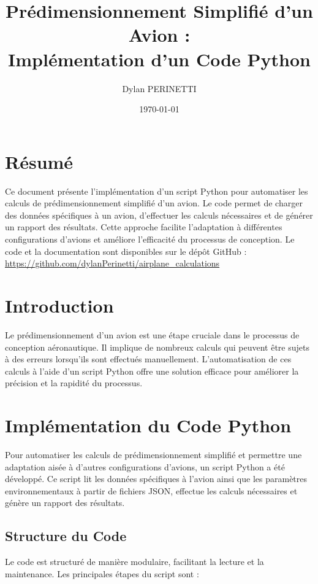 \documentclass[12pt,a4paper]{article}
\title{\textbf{Prédimensionnement Simplifié d'un Avion : \\ Implémentation d'un Code Python}}
\author{Dylan PERINETTI}
\date{\today}
\begin{document}
\maketitle

\tableofcontents
\newpage

\section*{Résumé}

Ce document présente l'implémentation d'un script Python pour automatiser les calculs de prédimensionnement simplifié d'un avion. Le code permet de charger des données spécifiques à un avion, d'effectuer les calculs nécessaires et de générer un rapport des résultats. Cette approche facilite l'adaptation à différentes configurations d'avions et améliore l'efficacité du processus de conception. Le code et la documentation sont disponibles sur le dépôt GitHub : \url{https://github.com/dylanPerinetti/airplane_calculations}

\section{Introduction}

Le prédimensionnement d'un avion est une étape cruciale dans le processus de conception aéronautique. Il implique de nombreux calculs qui peuvent être sujets à des erreurs lorsqu'ils sont effectués manuellement. L'automatisation de ces calculs à l'aide d'un script Python offre une solution efficace pour améliorer la précision et la rapidité du processus.

\section{Implémentation du Code Python}

Pour automatiser les calculs de prédimensionnement simplifié et permettre une adaptation aisée à d'autres configurations d'avions, un script Python a été développé. Ce script lit les données spécifiques à l'avion ainsi que les paramètres environnementaux à partir de fichiers JSON, effectue les calculs nécessaires et génère un rapport des résultats.

\subsection{Structure du Code}

Le code est structuré de manière modulaire, facilitant la lecture et la maintenance. Les principales étapes du script sont :
\end{document}
